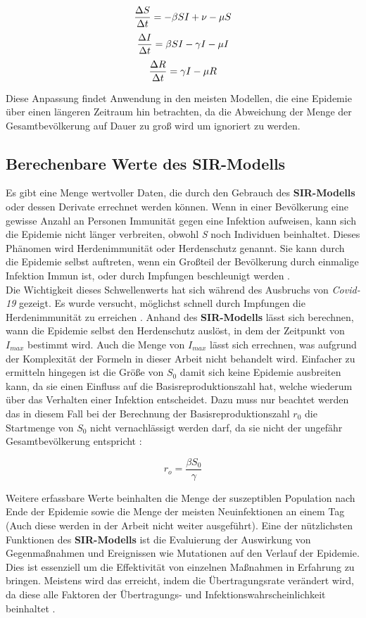\documentclass[12pt]{scrartcl} %
\begin{document}
$$ \frac{\Delta S}{\Delta t} = -\beta\space S I + \nu - \mu S $$
$$ \frac{\Delta I}{\Delta t} = \beta\space S I -\gamma\space I - \mu I $$
$$ \frac{\Delta R}{\Delta t} = \gamma\space I - \mu R $$

Diese Anpassung findet Anwendung in den meisten Modellen, die eine Epidemie über einen längeren Zeitraum hin betrachten, da die Abweichung der Menge der Gesamtbevölkerung auf Dauer zu groß wird um ignoriert zu werden.


\subsection{Berechenbare Werte des SIR-Modells}

Es gibt eine Menge wertvoller Daten, die durch den Gebrauch des \textbf{SIR-Modells} oder dessen Derivate errechnet werden können.
Wenn in einer Bevölkerung eine gewisse Anzahl an Personen Immunität gegen eine Infektion aufweisen, kann sich die Epidemie nicht länger verbreiten, obwohl \textsl{S} noch Individuen beinhaltet. Dieses Phänomen wird Herdenimmunität oder Herdenschutz genannt. Sie kann durch die Epidemie selbst auftreten, wenn ein Großteil der Bevölkerung durch einmalige Infektion Immun ist, oder durch Impfungen beschleunigt werden \cite{3}.\\
Die Wichtigkeit dieses Schwellenwerts hat sich während des Ausbruchs von \textsl{Covid-19} gezeigt. Es wurde versucht, möglichst schnell durch Impfungen die Herdenimmunität zu erreichen \cite{10}. Anhand des \textbf{SIR-Modells} lässt sich berechnen, wann die Epidemie selbst den Herdenschutz auslöst, in dem der Zeitpunkt von $ \textit{I}_{max} $ bestimmt wird. Auch die Menge von $ \textit{I}_{max} $ lässt sich errechnen, was aufgrund der Komplexität der Formeln in dieser Arbeit nicht behandelt wird. Einfacher zu ermitteln hingegen ist die Größe von $ \textit{S}_{0} $ damit sich keine Epidemie ausbreiten kann, da sie einen Einfluss auf die Basisreproduktionszahl hat, welche wiederum über das Verhalten einer Infektion entscheidet. 
Dazu muss nur beachtet werden das in diesem Fall bei der Berechnung der Basisreproduktionszahl $\textit{r}_{0} $ die Startmenge von $ \textit{S}_{0}$ nicht vernachlässigt werden darf, da sie nicht der ungefähr Gesamtbevölkerung entspricht \cite{7, 10}:

$$ r_{o} = \frac{\beta S_{0}}{\gamma} $$

Weitere erfassbare Werte beinhalten die Menge der suszeptiblen Population nach Ende der Epidemie sowie die Menge der meisten Neuinfektionen an einem Tag (Auch diese werden in der Arbeit nicht weiter ausgeführt). Eine der nützlichsten Funktionen des \textbf{SIR-Modells} ist die Evaluierung der Auswirkung von Gegenmaßnahmen und Ereignissen wie Mutationen auf den Verlauf der Epidemie. Dies ist essenziell um die Effektivität von einzelnen Maßnahmen in Erfahrung zu bringen. Meistens wird das erreicht, indem die Übertragungsrate \textbeta\space verändert wird, da diese alle Faktoren der Übertragungs- und Infektionswahrscheinlichkeit beinhaltet \cite{8, 6, 9}.
\end{document}
